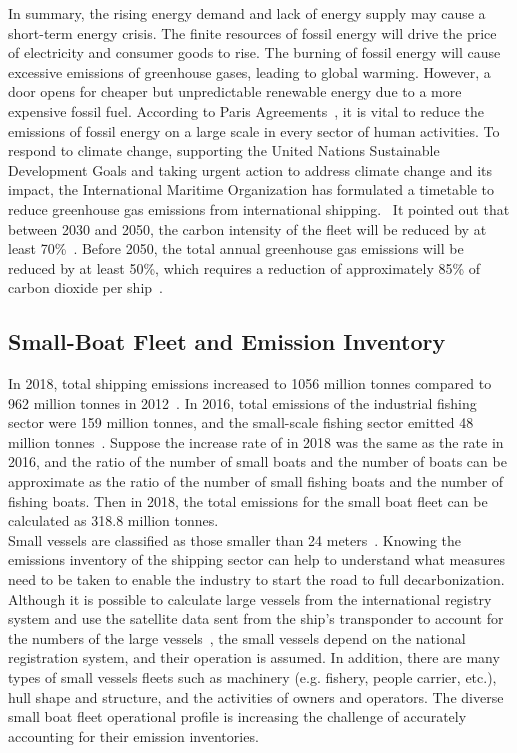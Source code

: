 In summary, the rising energy demand and lack of energy supply may cause a short-term energy crisis. The finite resources of fossil energy will drive the price of electricity and consumer goods to rise. The burning of fossil energy will cause excessive emissions of greenhouse gases, leading to global warming. However, a door opens for cheaper but unpredictable renewable energy due to a more expensive fossil fuel. According to Paris Agreements~\cite{unies2015accord}, it is vital to reduce the emissions of fossil energy on a large scale in every sector of human activities. To respond to climate change, supporting the United Nations Sustainable Development Goals and taking urgent action to address climate change and its impact, the International Maritime Organization has formulated a timetable to reduce greenhouse gas emissions from international shipping.~\cite{joung2020imo} It pointed out that between 2030 and 2050, the carbon intensity of the fleet will be reduced by at least 70\%~\cite{joung2020imo}. Before 2050, the total annual greenhouse gas emissions will be reduced by at least 50\%, which requires a reduction of approximately 85\% of carbon dioxide per ship~\cite{joung2020imo}.\\ 

\subsection{Small-Boat Fleet and Emission Inventory}
In 2018, total shipping  emissions increased to 1056 million tonnes compared to 962 million tonnes in 2012~\cite{IMO2021Fourth}.
In 2016, total  emissions of the industrial fishing sector were 159 million tonnes, and the small-scale fishing sector emitted 48 million tonnes~\cite{GREER2019103382}. Suppose the increase rate of  in 2018 was the same as the rate in 2016, and the ratio of the number of small boats and the number of boats can be approximate as the ratio of the number of small fishing boats and the number of fishing boats. Then in 2018, the total  emissions for the small boat fleet can be calculated as 318.8 million tonnes.\\

Small vessels are classified as those smaller than 24 meters~\cite{uk2021Operational}. Knowing the emissions inventory of the shipping sector can help to understand what measures need to be taken to enable the industry to start the road to full decarbonization. Although it is possible to calculate large vessels from the international registry system and use the satellite data sent from the ship's transponder to account for the numbers of the large vessels~\cite{IMO2021Fourth}, the small vessels depend on the national registration system, and their operation is assumed. In addition, there are many types of small vessels fleets such as machinery (e.g. fishery, people carrier, etc.), hull shape and structure, and the activities of owners and operators. The diverse small boat fleet operational profile is increasing the challenge of accurately accounting for their emission inventories.\\

